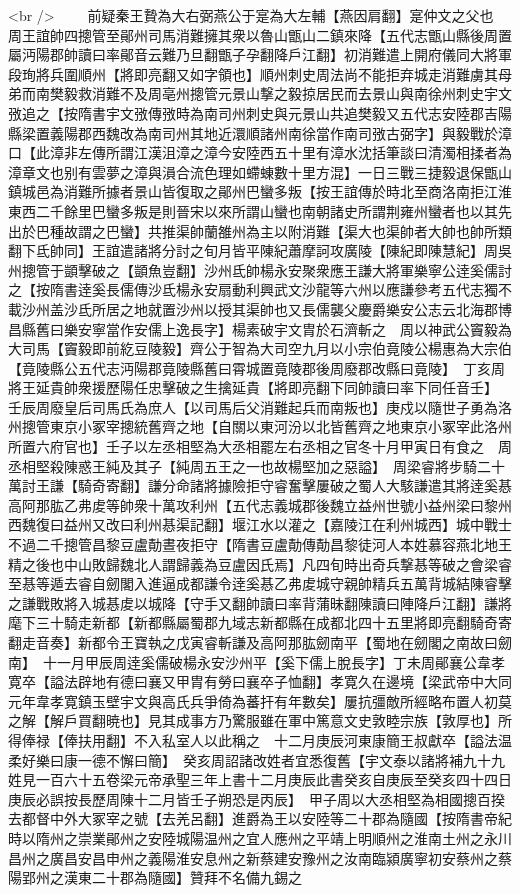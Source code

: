 <br />
　　前疑秦王贄為大右弼燕公于寔為大左輔【燕因肩翻】寔仲文之父也　周王誼帥四摠管至鄖州司馬消難擁其衆以魯山甑山二鎮來降【五代志甑山縣後周置屬沔陽郡帥讀曰率鄖音云難乃旦翻甑子孕翻降戶江翻】初消難遣上開府儀同大將軍段珣將兵圍順州【將即亮翻又如字領也】順州刺史周法尚不能拒弃城走消難虜其母弟而南樊毅救消難不及周亳州摠管元景山撃之毅掠居民而去景山與南徐州刺史宇文㢸追之【按隋書宇文㢸傳㢸時為南司州刺史與元景山共追樊毅又五代志安陸郡吉陽縣梁置義陽郡西魏改為南司州其地近澴順諸州南徐當作南司㢸古弼字】與毅戰於漳口【此漳非左傳所謂江漢沮漳之漳今安陸西五十里有漳水沈括筆談曰清濁相揉者為漳章文也别有雲夢之漳與溳合流色理如螮蝀數十里方混】一日三戰三捷毅退保甑山鎮城邑為消難所據者景山皆復取之鄖州巴蠻多叛【按王誼傳於時北至商洛南拒江淮東西二千餘里巴蠻多叛是則晉宋以來所謂山蠻也南朝諸史所謂荆雍州蠻者也以其先出於巴種故謂之巴蠻】共推渠帥蘭雒州為主以附消難【渠大也渠帥者大帥也帥所類翻下氐帥同】王誼遣諸將分討之旬月皆平陳紀蕭摩訶攻廣陵【陳紀即陳慧紀】周吳州摠管于顗擊破之【顗魚豈翻】沙州氐帥楊永安聚衆應王謙大將軍樂寧公逹奚儒討之【按隋書逹奚長儒傳沙氐楊永安扇動利興武文沙龍等六州以應謙參考五代志獨不載沙州盖沙氐所居之地就置沙州以授其渠帥也又長儒襲父慶爵樂安公志云北海郡博昌縣舊曰樂安寧當作安儒上逸長字】楊素破宇文胄於石濟斬之　周以神武公竇毅為大司馬【竇毅即前紇豆陵毅】齊公于智為大司空九月以小宗伯竟陵公楊惠為大宗伯【竟陵縣公五代志沔陽郡竟陵縣舊曰霄城置竟陵郡後周廢郡改縣曰竟陵】　丁亥周將王延貴帥衆援歷陽任忠擊破之生擒延貴【將即亮翻下同帥讀曰率下同任音壬】　壬辰周廢皇后司馬氏為庶人【以司馬后父消難起兵而南叛也】庚戍以隨世子勇為洛州摠管東京小冢宰摠統舊齊之地【自關以東河汾以北皆舊齊之地東京小冢宰此洛州所置六府官也】壬子以左丞相堅為大丞相罷左右丞相之官冬十月甲寅日有食之　周丞相堅殺陳惑王純及其子【純周五王之一也故楊堅加之惡謚】　周梁睿將步騎二十萬討王謙【騎奇寄翻】謙分命諸將據險拒守睿奮擊屢破之蜀人大駭謙遣其將逹奚惎高阿那肱乙弗䖍等帥衆十萬攻利州【五代志義城郡後魏立益州世號小益州梁曰黎州西魏復曰益州又改曰利州惎渠記翻】堰江水以灌之【嘉陵江在利州城西】城中戰士不過二千摠管昌黎豆盧勣晝夜拒守【隋書豆盧勣傳勣昌黎徒河人本姓慕容燕北地王精之後也中山敗歸魏北人謂歸義為豆盧因氏焉】凡四旬時出奇兵撃惎等破之會梁睿至惎等遁去睿自劒閣入進逼成都謙令逹奚惎乙弗䖍城守親帥精兵五萬背城結陳睿擊之謙戰敗將入城惎䖍以城降【守手又翻帥讀曰率背蒲昧翻陳讀曰陣降戶江翻】謙將麾下三十騎走新都【新都縣屬蜀郡九域志新都縣在成都北四十五里將即亮翻騎奇寄翻走音奏】新都令王寶執之戊寅睿斬謙及高阿那肱劒南平【蜀地在劒閣之南故曰劒南】　十一月甲辰周逹奚儒破楊永安沙州平【奚下儒上脫長字】丁未周鄖襄公韋孝寛卒【謚法辟地有德曰襄又甲胄有勞曰襄卒子恤翻】孝寛久在邊境【梁武帝中大同元年韋孝寛鎮玉壁宇文與高氏兵爭倚為蕃扞有年數矣】屢抗彊敵所經略布置人初莫之解【解戶買翻暁也】見其成事方乃驚服雖在軍中篤意文史敦睦宗族【敦厚也】所得俸禄【俸扶用翻】不入私室人以此稱之　十二月庚辰河東康簡王叔獻卒【謚法温柔好樂曰康一德不懈曰簡】　癸亥周詔諸改姓者宜悉復舊【宇文泰以諸將補九十九姓見一百六十五卷梁元帝承聖三年上書十二月庚辰此書癸亥自庚辰至癸亥四十四日庚辰必誤按長歷周陳十二月皆壬子朔恐是丙辰】　甲子周以大丞相堅為相國摠百揆去都督中外大冢宰之號【去羌呂翻】進爵為王以安陸等二十郡為隨國【按隋書帝紀時以隋州之崇業鄖州之安陸城陽温州之宜人應州之平靖上明順州之淮南土州之永川昌州之廣昌安昌申州之義陽淮安息州之新蔡建安豫州之汝南臨潁廣寧初安蔡州之蔡陽郢州之漢東二十郡為隨國】贊拜不名備九錫之
